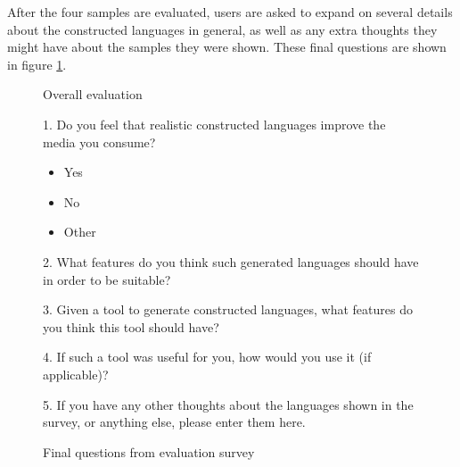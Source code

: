 \documentclass{report}
\begin{document}
	After the four samples are evaluated, users are asked to expand on several details about the constructed languages in general, as well as any extra thoughts they might have about the samples they were shown. These final questions are shown in figure \ref{final questions from evaluation survey}.
	
	\begin{figure}
		\caption{Final questions from evaluation survey}
		\label{final questions from evaluation survey}
		\centering
		\begin{tcolorbox}
			\begin{Large}Overall evaluation\end{Large}
			
			1. Do you feel that realistic constructed languages improve the media you consume?
			
			\begin{itemize}
				\item Yes
				\item No
				\item Other \underline{\hspace{5cm}}
			\end{itemize}
			
			\vspace{0.3cm}
		
			2. What features do you think such generated languages should have in order to be suitable?
			
			\underline{\hspace{10cm}}
			\underline{\hspace{10cm}}
			\underline{\hspace{10cm}}
			\vspace{0.3cm}
			
			3. Given a tool to generate constructed languages, what features do you think this tool should have?
			
			\underline{\hspace{10cm}}
			\underline{\hspace{10cm}}
			\underline{\hspace{10cm}}
			\vspace{0.3cm}
			
			4. If such a tool was useful for you, how would you use it (if applicable)?
			
			\underline{\hspace{10cm}}
			\underline{\hspace{10cm}}
			\underline{\hspace{10cm}}
			\vspace{0.3cm}
			
			5. If you have any other thoughts about the languages shown in the survey, or anything else, please enter them here.
			
			\underline{\hspace{10cm}}
			\underline{\hspace{10cm}}
			\underline{\hspace{10cm}}
			\vspace{0.3cm}
		\end{tcolorbox}
	\end{figure}
\end{document}
